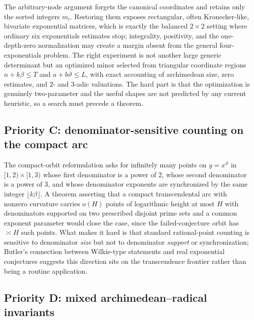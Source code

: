 \documentclass[11pt,oneside]{article}
\theoremstyle{definition}
\theoremstyle{remark}
\newcommand{\thetaq}{\vartheta}
\begin{document}
The arbitrary-node argument forgets the canonical coordinates and retains only the sorted
integers $m_i$.  Restoring them exposes rectangular, often Kronecker-like, bivariate
exponential matrices, which is exactly the balanced $2\times2$ setting where ordinary six
exponentials estimates stop; integrality, positivity, and the one-depth-zero normalization
may create a margin absent from the general four-exponentials problem.  The right experiment
is not another large generic determinant but an optimized minor selected from triangular
coordinate regions $n+k\beta\le T$ and $a+b\thetaq\le L$, with exact accounting of
archimedean size, zero estimates, and $2$- and $3$-adic valuations.  The hard part is that
the optimization is genuinely two-parameter and the useful shapes are not predicted by any
current heuristic, so a search must precede a theorem.

\subsection{Priority C: denominator-sensitive counting on the compact arc}
\label{at:prog-counting}

The compact-orbit reformulation asks for infinitely many points on $y=x^{\thetaq}$ in
$[1,2)\times[1,3)$ whose first denominator is a power of $2$, whose second denominator is a
power of $3$, and whose denominator exponents are synchronized by the same integer
$\lfloor k\beta\rfloor$.  A theorem asserting that a compact transcendental arc with nonzero
curvature carries $o(H)$ points of logarithmic height at most $H$ with denominators
supported on two prescribed disjoint prime sets and a common exponent parameter would close
the case, since the failed-conjecture orbit has $\asymp H$ such points.  What makes it hard
is that standard rational-point counting is sensitive to denominator \emph{size} but not to
denominator \emph{support} or synchronization; Butler's connection between Wilkie-type
statements and real exponential conjectures \cite{Butler2017} suggests this direction sits
on the transcendence frontier rather than being a routine application.

\subsection{Priority D: mixed archimedean--radical invariants}
\label{at:prog-radical}
\end{document}
